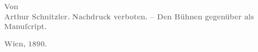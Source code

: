 \pstart
           \centering{}\textcolor{gray}{\textbf{}}\pend
           
\pstart
           \centering{}\textcolor{gray}{\textbf{Von}}{\\}\textcolor{gray}{\textbf{\textbf{Arthur Schnitzler.}}}\pend
           {\vspace{1\baselineskip}}
\pstart
           \centering{}\textcolor{gray}{\textbf{Nachdruck verboten. – Den Bühnen gegenüber als Manuſcript.}}\pend
           
\pstart
           \centering{}\textcolor{gray}{\textbf{Wien, 1890.}}\pend
           \endnumbering{}  \newcommand{\dateiname}{L00011}\newcommand{\titel}{Arthur Schnitzler: Widmungsexemplar Alkandi’s Lied für Hugo von Hofmannsthal, [5.? 5. 1891]}\newcommand{\editorInnen}{Martin Anton Müller und Gerd-Hermann Susen}
